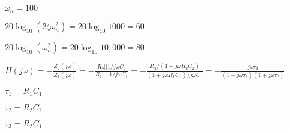 \documentclass{article}
\def\lthtmlcheckvsize{\ifdim\ht\sizebox<\vsize 
  \ifdim\wd\sizebox<\hsize\expandafter\hfill\fi \expandafter\vfill
  \else\expandafter\vss\fi}%
\begin{document}
{\newpage\clearpage
{}%
$ \omega_n=100$%
\lthtmlindisplaymathZ
\lthtmlcheckvsize\clearpage}

{\newpage\clearpage
{}%
$ 20\log_{10} (2\zeta\omega_n^2)=20\log_{10} 1000=60$%
\lthtmlindisplaymathZ
\lthtmlcheckvsize\clearpage}

{\newpage\clearpage
{}%
$ 20\log_{10}(\omega_n^2)=20\log_{10} 10,000=80$%
\lthtmlindisplaymathZ
\lthtmlcheckvsize\clearpage}

{\newpage\clearpage
{}%
$\displaystyle H(j\omega)=-\frac{Z_2(j\omega)}{Z_1(j\omega)}
=-\frac{R_2||1/j\omega C_2}{R_1+1/j\omega C_1}
=-\frac{R_2/(1+j\omega R_2C_2)}{(1+j\omega R_1C_1)/j\omega C_1}
=-\frac{j\omega \tau_3}{(1+j\omega \tau_1)(1+j\omega \tau_2)}$%
\lthtmlindisplaymathZ
\lthtmlcheckvsize\clearpage}

{\newpage\clearpage
{}%
$ \tau_1=R_1C_1$%
\lthtmlindisplaymathZ
\lthtmlcheckvsize\clearpage}

{\newpage\clearpage
{}%
$ \tau_2=R_2C_2$%
\lthtmlindisplaymathZ
\lthtmlcheckvsize\clearpage}

{\newpage\clearpage
{}%
$ \tau_3=R_2C_1$%
\lthtmlindisplaymathZ
\lthtmlcheckvsize\clearpage}
\end{document}
